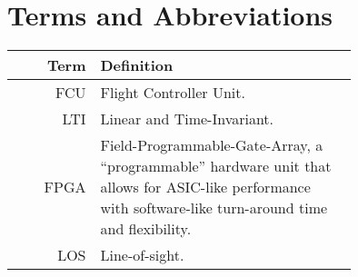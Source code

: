 \section*{Terms and Abbreviations}

\begin{tabular}[h]{rp{0.75\linewidth}}
    \hline
    \textbf{Term} & \textbf{Definition}\\
    \hline

    FCU & Flight Controller Unit.\\
    LTI & Linear and Time-Invariant.\\

    FPGA & Field-Programmable-Gate-Array, a ``programmable'' hardware unit that allows for ASIC-like performance with software-like turn-around time and flexibility.\\
    LOS & Line-of-sight.\\

\end{tabular}
